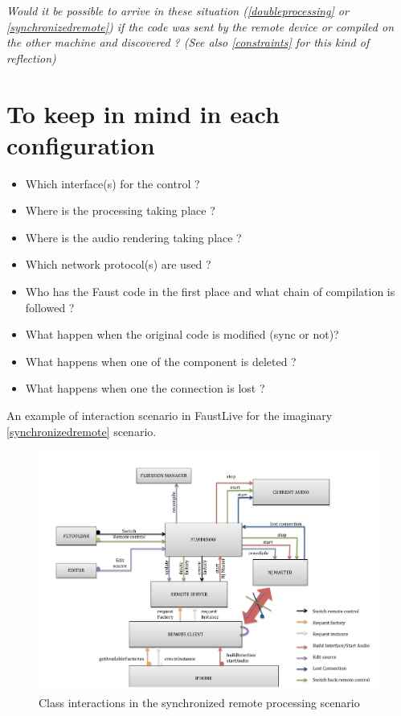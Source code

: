 \documentclass[a4paper]{article}
\begin{document}
{\it Would it be possible to arrive in these situation (\ref{doubleprocessing} or \ref{synchronizedremote}) if the code was sent by the remote device or compiled on the other machine and discovered ? (See also \ref{constraints} for this kind of reflection)}

\newpage
\section{To keep in mind in each configuration}

\begin{itemize}
\item  Which interface(s) for the control ?
\item Where is the processing taking place ?
\item Where is the audio rendering taking place ?
\item Which network protocol(s) are used ?
\item Who has the Faust code in the first place and what chain of compilation is followed ?
\item What happen when the original code is modified (sync or not)?
\item What happens when one of the component is deleted ?
\item What happens when one the connection is lost ?
\end{itemize}

An example of interaction scenario in FaustLive for the imaginary \ref{synchronizedremote} scenario.

\begin{figure}[!h]
\begin{center}
\begin{minipage}[c]{\linewidth}
\includegraphics[width=0.9\columnwidth]{images/RemoteControl.pdf}
\end{minipage}
\caption{Class interactions in the synchronized remote processing scenario}
\label{fig:remotecontrolInteractions}
\end{center}
\end{figure}
\end{document}
